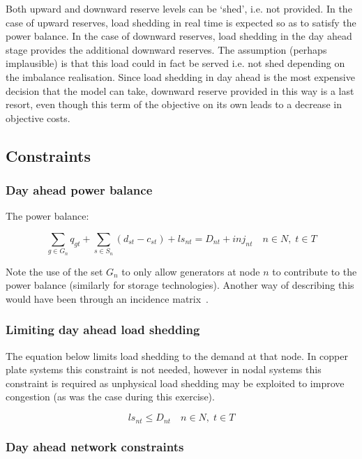 \documentclass[number,times]{elsarticle}
\begin{document}
Both upward and downward reserve levels can be `shed', i.e. not provided. In the case of upward reserves, load shedding in real time is expected so as to satisfy the power balance. In the case of downward reserves, load shedding in the day ahead stage provides the additional downward reserves. The assumption (perhaps implausible) is that this load could in fact be served i.e. not shed depending on the imbalance realisation.  Since load shedding in day ahead is the most expensive decision that the model can take, downward reserve provided in this way is a last resort, even though this term of the objective on its own leads to a decrease in objective costs.

\subsection{Constraints}

\subsubsection{Day ahead power balance}

The power balance:

\begin{equation}
    \sum_{g \in G_n} q_{gt} + \sum_{s \in S_n} (d_{st} - c_{st}) + ls_{nt} = D_{nt} + inj_{nt} \quad n \in N, \; t \in T
\end{equation}

Note the use of the set $G_n$ to only allow generators at node $n$ to contribute to the power balance (similarly for storage technologies). Another way of describing this would have been through an incidence matrix~\cite{Belderbos2020}.

\subsubsection{Limiting day ahead load shedding}

The equation below limits load shedding to the demand at that node. In copper plate systems this constraint is not needed, however in nodal systems this constraint is required as unphysical load shedding may be exploited to improve congestion (as was the case during this exercise).

\begin{equation}
    ls_{nt} \leq D_{nt} \quad n \in N, \; t \in T
\end{equation}

\subsubsection{Day ahead network constraints}
\end{document}
